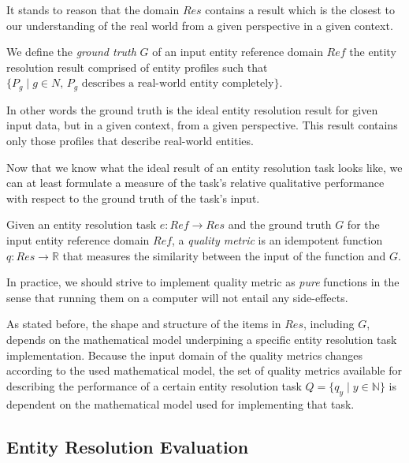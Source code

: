 \documentclass[lettersize,journal]{IEEEtran}
\begin{document}
    It stands to reason that the domain $Res$ contains a result which is the
    closest to our understanding of the real world from a given perspective in
    a given context.

    \begin{defn}
        We define the \textit{ground truth} $G$ of an input entity reference
        domain $Ref$ the entity resolution result comprised of entity profiles
        such that
        $\{P_g \mid g \in N\textrm{, $P_g$ describes a real-world entity
        completely}\}$.
    \end{defn}

    In other words the ground truth is the ideal entity resolution result for 
    given input data, but in a given context, from a given perspective.
    This result contains only those profiles that describe real-world entities.

    Now that we know what the ideal result of an entity resolution task looks
    like, we can at least formulate a measure of the task's relative qualitative
    performance with respect to the ground truth of the task's input.
    
    \begin{defn}
    Given an entity resolution task $e: Ref \rightarrow Res$ and the ground
    truth $G$ for the input entity reference domain $Ref$, a \textit{quality
    metric} is an idempotent function $q: Res \rightarrow \mathbb{R}$ that
    measures the similarity between the input of the function and $G$.
    \end{defn}

    In practice, we should strive to implement quality metric as \textit{pure}
    functions in the sense that running them on a computer will not entail any
    side-effects.

    As stated before, the shape and structure of the items in $Res$, including
    $G$, depends on the mathematical model underpining a specific entity
    resolution task implementation.
    Because the input domain of the quality metrics changes according to the
    used mathematical model, the set of quality metrics available for describing
    the performance of a certain entity resolution task $Q = \{q_y \mid y \in
    \mathbb{N}\}$ is dependent on the mathematical model used for implementing
    that task.

    \subsection[ere]{Entity Resolution Evaluation}\label{sec:ere}
\end{document}
